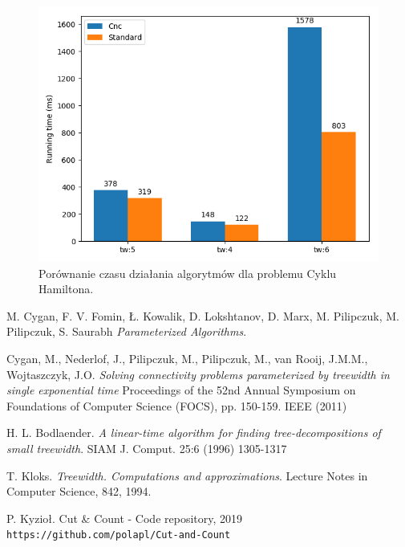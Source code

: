 \documentclass[12pt, oneside]{report}
\begin{document}
\begin{figure}
\centering
\includegraphics[width=14cm]{hamiltonian_test_time.png}
\caption{Porównanie czasu działania algorytmów dla problemu Cyklu Hamiltona.}
\label{hamiltonian_test_time}
\end{figure}


\newpage
	\begin{thebibliography}{9}
			M. Cygan, F. V. Fomin, Ł. Kowalik, D. Lokshtanov, D. Marx, M. Pilipczuk, M. Pilipczuk, S. Saurabh
 			\textit{Parameterized Algorithms}.
 			
 			Cygan, M., Nederlof, J., Pilipczuk, M., Pilipczuk, M., van Rooij, J.M.M., Wojtaszczyk,
J.O.
			\textit{Solving connectivity problems parameterized by treewidth in single
exponential time}
			Proceedings of the 52nd Annual Symposium on Foundations of Computer Science (FOCS), pp. 150-159. IEEE (2011)
 					
			H. L. Bodlaender. 
			\textit{A linear-time algorithm for finding tree-decompositions of small treewidth}. 
			SIAM J. Comput. 25:6 (1996) 1305-1317		
		
			T. Kloks. 
			\textit{Treewidth. Computations and approximations}. 
			Lecture Notes in Computer Science, 842, 1994.
 			
			P. Kyzioł. Cut \& Count - Code repository, 2019
			\\\texttt{https://github.com/polapl/Cut-and-Count}
	\end{thebibliography} 
\end{document}
